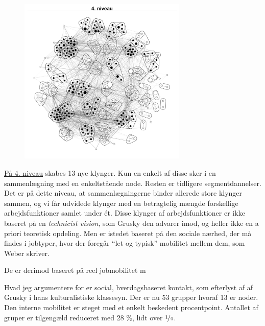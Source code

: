 \begin{figure}
  \vspace{-20pt}
  \begin{center}
    \includegraphics[width=8cm]{fig/netvaerkskort/kort_seg_proces4.pdf}
   \caption{}
   \label{fig_delanalyse1_kort_seg_proces4}
  \end{center}
  \vspace{-20pt}
\end{figure}

\underline{På 4. niveau} skabes 13 nye klynger. Kun en enkelt af disse sker i en sammenlægning med en enkeltstående node. Resten er tidligere segmentdannelser. Det er på dette niveau, at sammenlægningerne binder allerede store klynger sammen, og vi får udvidede klynger med en betragtelig mængde forskellige arbejdsfunktioner samlet under ét. Disse klynger af arbejdsfunktioner er ikke baseret på en \emph{technicist vision}, som Grusky den advarer imod, og heller ikke en a priori teoretisk opdeling. Men er istedet baseret på den sociale nærhed, der må findes i jobtyper, hvor der foregår “let og typisk” mobilitet mellem dem, som Weber skriver. %
%
%
 

De er derimod baseret på reel jobmobilitet m

Hvad jeg argumentere for er social, hverdagsbaseret kontakt, som efterlyst af af Grusky i hans kulturalistiske klassesyn.  Der er nu 53 grupper hvoraf 13 er noder. Den interne mobilitet er steget med et enkelt beskedent procentpoint. Antallet af gruper er tilgengæld reduceret med 28 \%, lidt over $\nicefrac{1}{4}$.

